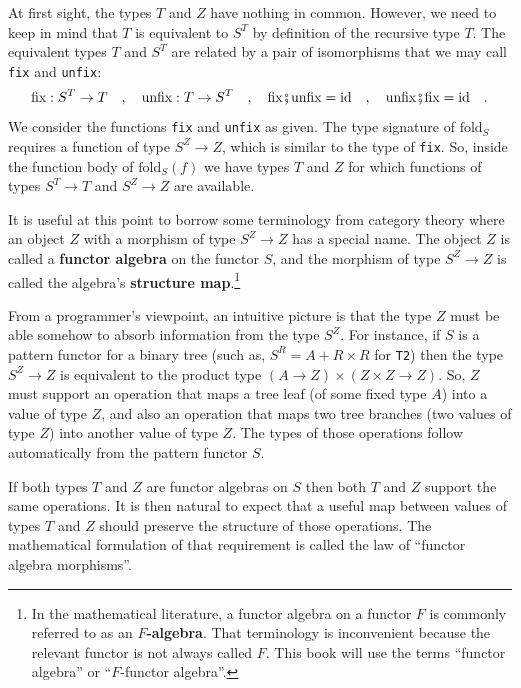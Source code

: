 At first sight, the types $T$ and $Z$ have nothing in common. However,
we need to keep in mind that $T$ is equivalent to $S^{T}$ by definition
of the recursive type $T$. The equivalent types $T$ and $S^{T}$
are related by a pair of isomorphisms that we may call \lstinline!fix!
and \lstinline!unfix!:
\[
\text{fix}:S^{T}\rightarrow T\quad,\quad\text{unfix}:T\rightarrow S^{T}\quad,\quad\text{fix}\bef\text{unfix}=\text{id}\quad,\quad\text{unfix}\bef\text{fix}=\text{id}\quad.
\]
We consider the functions \lstinline!fix! and \lstinline!unfix!
as given. The type signature of $\text{fold}_{S}$ requires a function
of type $S^{Z}\rightarrow Z$, which is similar to the type of \lstinline!fix!.
So, inside the function body of $\text{fold}_{S}(f)$ we have types
$T$ and $Z$ for which functions of types $S^{T}\rightarrow T$ and
$S^{Z}\rightarrow Z$ are available.

It is useful at this point to borrow some terminology from category
theory where an object $Z$ with a morphism of type $S^{Z}\rightarrow Z$
has a special name. The object $Z$ is called a \textbf{functor algebra}
on the functor $S$, and the morphism of type
$S^{Z}\rightarrow Z$ is called the algebra\textsf{'}s \textbf{structure map}.\footnote{In the mathematical literature, a functor algebra on a functor $F$
is commonly referred to as an $F$\textbf{-algebra}.
That terminology is inconvenient because the relevant functor is not
always called $F$. This book will use the terms \textsf{``}functor algebra\textsf{''}
or \textsf{``}$F$-functor algebra\textsf{''}.}

From a programmer\textsf{'}s viewpoint, an intuitive picture is that the type
$Z$ must be able somehow to absorb information from the type $S^{Z}$.
For instance, if $S$ is a pattern functor for a binary tree (such
as, $S^{R}=A+R\times R$ for \lstinline!T2!) then the type $S^{Z}\rightarrow Z$
is equivalent to the product type $(A\rightarrow Z)\times(Z\times Z\rightarrow Z)$.
So, $Z$ must support an operation that maps a tree leaf (of some
fixed type $A$) into a value of type $Z$, and also an operation
that maps two tree branches (two values of type $Z$) into another
value of type $Z$. The types of those operations follow automatically
from the pattern functor $S$. 

If both types $T$ and $Z$ are functor algebras on $S$ then both
$T$ and $Z$ support the same operations. It is then natural to expect
that a useful map between values of types $T$ and $Z$ should preserve
the structure of those operations. The mathematical formulation of
that requirement is called the law of \textsf{``}functor
algebra morphisms\textsf{''}.

